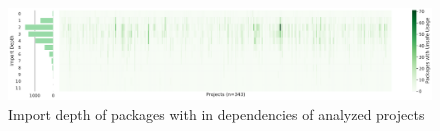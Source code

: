 \begin{figure}[htp!]
    \centering
    \includegraphics[width=\textwidth]{assets/plots/chapter4/unsafe-import-depth.pdf}
    \caption{Import depth of packages with \unsafe{} in dependencies of analyzed projects}
    \label{fig:unsafe-import-depth}
\end{figure}
